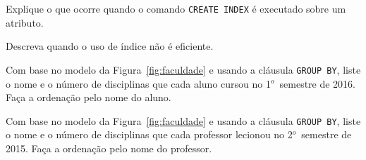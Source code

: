 

 Explique o que ocorre quando o comando {\tt CREATE INDEX}
é executado sobre um atributo.

 Descreva quando o uso de índice não é eficiente.

 Com base no modelo da Figura~\ref{fig:faculdade} e usando
a cláusula {\tt GROUP BY}, liste o nome e o número de disciplinas que
cada aluno cursou no 1$^o$~semestre de 2016. Faça a ordenação pelo nome
do aluno.

 Com base no modelo da Figura~\ref{fig:faculdade} e usando
a cláusula {\tt GROUP BY}, liste o nome e o número de disciplinas que
cada professor lecionou no 2$^o$~semestre de 2015. Faça a ordenação
pelo nome do professor.

